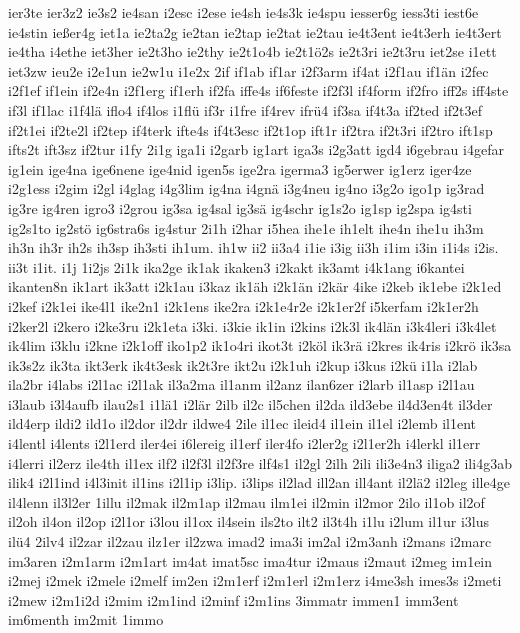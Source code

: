 {ier3te
ier3z2
ie3s2
ie4san
i2esc
i2ese
ie4sh
ie4s3k
ie4spu
iesser6g
iess3ti
iest6e
ie4stin
ießer4g
iet1a
ie2ta2g
ie2tan
ie2tap
ie2tat
ie2tau
ie4t3ent
ie4t3erh
ie4t3ert
ie4tha
i4ethe
iet3her
ie2t3ho
ie2thy
ie2t1o4b
ie2t1ö2s
ie2t3ri
ie2t3ru
iet2se
i1ett
iet3zw
ieu2e
i2e1un
ie2w1u
i1e2x
2if
if1ab
if1ar
i2f3arm
if4at
i2f1au
if1än
i2fec
i2f1ef
if1ein
if2e4n
i2f1erg
if1erh
if2fa
iffe4s
if6feste
if2f3l
if4form
if2fro
iff2s
iff4ste
if3l
if1lac
i1f4lä
iflo4
if4los
i1flü
if3r
i1fre
if4rev
ifrü4
if3sa
if4t3a
if2ted
if2t3ef
if2t1ei
if2te2l
if2tep
if4terk
ifte4s
if4t3esc
if2t1op
ift1r
if2tra
if2t3ri
if2tro
ift1sp
ifts2t
ift3sz
if2tur
i1fy
2i1g
iga1i
i2garb
ig1art
iga3s
i2g3att
igd4
i6gebrau
i4gefar
ig1ein
ige4na
ige6nene
ige4nid
igen5s
ige2ra
igerma3
ig5erwer
ig1erz
iger4ze
i2g1ess
i2gim
i2gl
i4glag
i4g3lim
ig4na
i4gnä
i3g4neu
ig4no
i3g2o
igo1p
ig3rad
ig3re
ig4ren
igro3
i2grou
ig3sa
ig4sal
ig3sä
ig4schr
ig1s2o
ig1sp
ig2spa
ig4sti
ig2s1to
ig2stö
ig6stra6s
ig4stur
2i1h
i2har
i5hea
ihe1e
ih1elt
ihe4n
ihe1u
ih3m
ih3n
ih3r
ih2s
ih3sp
ih3sti
ih1um.
ih1w
ii2
ii3a4
i1ie
i3ig
ii3h
i1im
i3in
i1i4s
i2is.
ii3t
i1it.
i1j
1i2js
2i1k
ika2ge
ik1ak
ikaken3
i2kakt
ik3amt
i4k1ang
i6kantei
ikanten8n
ik1art
ik3att
i2k1au
i3kaz
ik1äh
i2k1än
i2kär
4ike
i2keb
ik1ebe
i2k1ed
i2kef
i2k1ei
ike4l1
ike2n1
i2k1ens
ike2ra
i2k1e4r2e
i2k1er2f
i5kerfam
i2k1er2h
i2ker2l
i2kero
i2ke3ru
i2k1eta
i3ki.
i3kie
ik1in
i2kins
i2k3l
ik4län
i3k4leri
i3k4let
ik4lim
i3klu
i2kne
i2k1off
iko1p2
ik1o4ri
ikot3t
i2köl
ik3rä
i2kres
ik4ris
i2krö
ik3sa
ik3s2z
ik3ta
ikt3erk
ik4t3esk
ik2t3re
ikt2u
i2k1uh
i2kup
i3kus
i2kü
i1la
i2lab
ila2br
i4labs
i2l1ac
i2l1ak
il3a2ma
il1anm
il2anz
ilan6zer
i2larb
il1asp
i2l1au
i3laub
i3l4aufb
ilau2s1
i1lä1
i2lär
2ilb
il2c
il5chen
il2da
ild3ebe
il4d3en4t
il3der
ild4erp
ildi2
ild1o
il2dor
il2dr
ildwe4
2ile
il1ec
ileid4
il1ein
il1el
i2lemb
il1ent
i4lentl
i4lents
i2l1erd
iler4ei
i6lereig
il1erf
iler4fo
i2ler2g
i2l1er2h
i4lerkl
il1err
i4lerri
il2erz
ile4th
il1ex
ilf2
il2f3l
il2f3re
ilf4s1
il2gl
2ilh
2ili
ili3e4n3
iliga2
ili4g3ab
ilik4
i2l1ind
i4l3init
il1ins
i2l1ip
i3lip.
i3lips
il2lad
ill2an
ill4ant
il2lä2
il2leg
ille4ge
il4lenn
il3l2er
1illu
il2mak
il2m1ap
il2mau
ilm1ei
il2min
il2mor
2ilo
il1ob
il2of
il2oh
il4on
il2op
i2l1or
i3lou
il1ox
il4sein
ils2to
ilt2
il3t4h
i1lu
i2lum
il1ur
i3lus
ilü4
2ilv4
il2zar
il2zau
ilz1er
il2zwa
imad2
ima3i
im2al
i2m3anh
i2mans
i2marc
im3aren
i2m1arm
i2m1art
im4at
imat5sc
ima4tur
i2maus
i2maut
i2meg
im1ein
i2mej
i2mek
i2mele
i2melf
im2en
i2m1erf
i2m1erl
i2m1erz
i4me3sh
imes3s
i2meti
i2mew
i2m1i2d
i2mim
i2m1ind
i2minf
i2m1ins
3immatr
immen1
imm3ent
im6menth
im2mit
1immo
}
